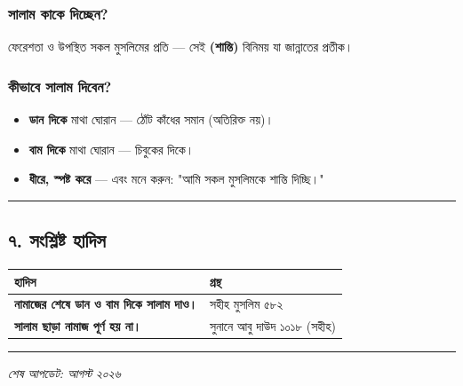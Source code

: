 \subsubsection*{\textbf{সালাম কাকে দিচ্ছেন?}}
ফেরেশতা ও উপস্থিত সকল মুসলিমের প্রতি — সেই \textbf{ (শান্তি)} বিনিময় যা জান্নাতের প্রতীক।

\subsubsection*{\textbf{কীভাবে সালাম দিবেন?}}
\begin{itemize}
\item \textbf{ডান দিকে} মাথা ঘোরান — ঠোঁট কাঁধের সমান (অতিরিক্ত নয়)।
\item \textbf{বাম দিকে} মাথা ঘোরান — চিবুকের দিকে।
\item \textbf{ধীরে, স্পষ্ট করে} — এবং মনে করুন: "আমি সকল মুসলিমকে শান্তি দিচ্ছি।"
\end{itemize}
\medskip\hrule\medskip

\subsection*{৭. সংশ্লিষ্ট হাদিস}

\begin{table}[h]\centering\small
\begin{tabular}{ll}
হাদিস & গ্রন্থ \\
\hline
\textbf{\lat{“}নামাজের শেষে ডান ও বাম দিকে সালাম দাও।\lat{”}} & সহীহ মুসলিম ৫৮২ \\
\textbf{\lat{“}সালাম ছাড়া নামাজ পূর্ণ হয় না।\lat{”}} & সুনানে আবু দাউদ ১০১৮ (সহীহ) \\
\hline
\end{tabular}
\end{table}

\medskip\hrule\medskip

\textit{শেষ আপডেট: আগস্ট ২০২৬}



